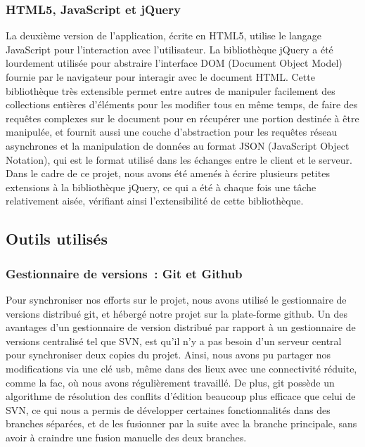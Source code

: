 \documentclass[a4paper,11pt,french]{article}
\begin{document}
{\subsubsection{HTML5, JavaScript et jQuery}

La deuxième version de l'application, écrite en HTML5, utilise le langage JavaScript pour l'interaction avec l'utilisateur. La bibliothèque jQuery a été lourdement utilisée pour abstraire l'interface DOM (Document Object Model) fournie par le navigateur pour interagir avec le document HTML. Cette bibliothèque très extensible permet entre autres de manipuler facilement des collections entières d'éléments pour les modifier tous en même temps, de faire des requêtes complexes sur le document pour en récupérer une portion destinée à être manipulée, et
fournit aussi une couche d'abstraction pour les requêtes réseau asynchrones et la manipulation de données au format JSON (JavaScript Object Notation), qui est le format utilisé dans les échanges entre le client et le serveur. Dans le cadre de ce projet, nous avons été amenés à écrire plusieurs petites extensions à la bibliothèque jQuery, ce qui a été à chaque fois une tâche relativement aisée, vérifiant ainsi l'extensibilité de cette bibliothèque.

\subsection{Outils utilisés}
\subsubsection{Gestionnaire de versions~: Git et Github}

Pour synchroniser nos efforts sur le projet, nous avons utilisé le gestionnaire de versions distribué git, et hébergé notre projet sur la plate-forme github. Un des avantages d'un gestionnaire de version distribué par rapport à un gestionnaire de versions centralisé tel que SVN, est qu'il n'y a pas besoin d'un serveur central pour synchroniser deux copies du projet. Ainsi, nous avons pu partager nos modifications via une clé usb, même dans des lieux avec une connectivité réduite, comme la fac, où nous avons régulièrement travaillé. 
De plus, git possède un algorithme de résolution des conflits d'édition beaucoup plus efficace que celui de SVN, ce qui nous a permis de développer certaines fonctionnalités dans des branches séparées, et de les fusionner par la suite avec la branche principale, sans avoir à craindre une fusion manuelle des deux branches.

}
\end{document}
